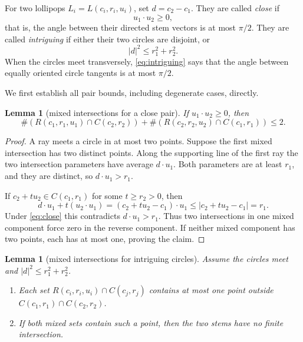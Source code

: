 \documentclass[11pt]{article}
\theoremstyle{plain}
\newtheorem{lemma}[theorem]{Lemma}
\theoremstyle{definition}
\theoremstyle{remark}
\newcommand{\1}{\mathbf 1}
\begin{document}
For two lollipops $L_i=L(c_i,r_i,u_i)$, set $d=c_2-c_1$.
They are called \emph{close} if
\begin{equation}\label{eq:close}
 u_1\cdot u_2\geq0,
\end{equation}
that is, the angle between their directed stem vectors is at most
$\pi/2$.  They are called \emph{intriguing} if either their two circles
are disjoint, or
\begin{equation}\label{eq:intriguing}
 |d|^2\leq r_1^2+r_2^2.
\end{equation}
When the circles meet transversely, \eqref{eq:intriguing} says that the angle
between equally oriented circle tangents is at most $\pi/2$.

We first establish all pair bounds, including degenerate cases, directly.

\begin{lemma}[mixed intersections for a close pair]\label{lem:close-mixed}
If $u_1\cdot u_2\geq0$, then
\[
 \#(R(c_1,r_1,u_1)\cap C(c_2,r_2))
 +\#(R(c_2,r_2,u_2)\cap C(c_1,r_1))\leq2.
\]
\end{lemma}

\begin{proof}
A ray meets a circle in at most two points.  Suppose the first mixed
intersection has two distinct points.  Along the supporting line of the first
ray the two intersection parameters have average $d\cdot u_1$.  Both
parameters are at least $r_1$, and they are distinct, so
$d\cdot u_1>r_1$.

If $c_2+t u_2\in C(c_1,r_1)$ for some $t\geq r_2>0$, then
\[
 d\cdot u_1+t(u_2\cdot u_1)
 =(c_2+t u_2-c_1)\cdot u_1
 \leq |c_2+t u_2-c_1|=r_1.
\]
Under \eqref{eq:close} this contradicts $d\cdot u_1>r_1$.  Thus two
intersections in one mixed component force zero in the reverse component.
If neither mixed component has two points, each has at most one, proving the
claim.
\end{proof}

\begin{lemma}[mixed intersections for intriguing circles]\label{lem:intr-mixed}
Assume the circles meet and $|d|^2\leq r_1^2+r_2^2$.
\begin{enumerate}[label=(\roman*)]
\item Each set $R(c_i,r_i,u_i)\cap C(c_j,r_j)$ contains at most one point
outside $C(c_1,r_1)\cap C(c_2,r_2)$.
\item If both mixed sets contain such a point, then the two stems have no
finite intersection.
\end{enumerate}
\end{lemma}
\end{document}
